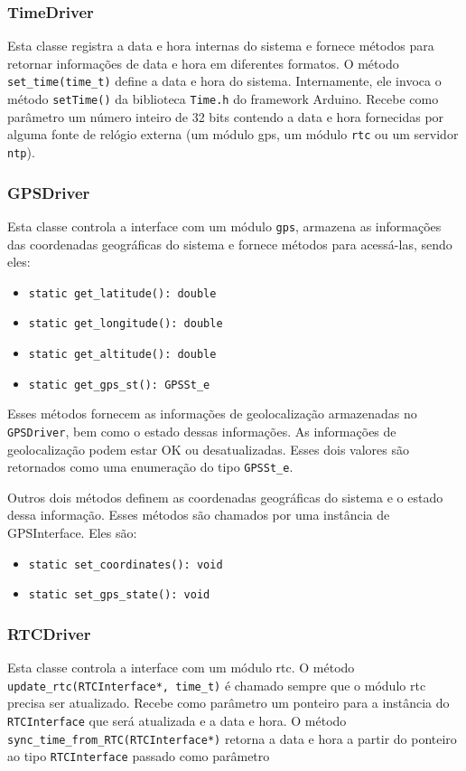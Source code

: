 \subsubsection{TimeDriver}
Esta classe registra a data e hora internas do sistema e fornece métodos para retornar informações de data e hora em diferentes formatos. O método \texttt{set\_time(time\_t)} define a data e hora do sistema. Internamente, ele invoca o método \texttt{setTime()} da biblioteca \texttt{Time.h} do framework Arduino. Recebe como parâmetro um número inteiro de 32 bits contendo a data e hora fornecidas por alguma fonte de relógio externa (um módulo \acrshort{gps}, um módulo \texttt{rtc} ou um servidor \texttt{ntp}).
\subsubsection{GPSDriver}
Esta classe controla a interface com um módulo \texttt{gps}, armazena as informações das coordenadas geográficas do sistema e fornece métodos para acessá-las, sendo eles:

\begin{itemize}
    \item \texttt{{static} get\_latitude(): double}
    \item \texttt{{static} get\_longitude(): double}
    \item \texttt{{static} get\_altitude(): double}
    \item \texttt{{static} get\_gps\_st(): GPSSt\_e}
\end{itemize}

Esses métodos fornecem as informações de geolocalização armazenadas no \texttt{GPSDriver}, bem como o estado dessas informações. As informações de geolocalização podem estar OK ou desatualizadas. Esses dois valores são retornados como uma enumeração do tipo \texttt{GPSSt\_e}.

Outros dois métodos definem as coordenadas geográficas do sistema e o estado dessa informação. Esses métodos são chamados por uma instância de GPSInterface. Eles são:

\begin{itemize}
    \item \texttt{{static} set\_coordinates(): void}
    \item \texttt{{static} set\_gps\_state(): void}
\end{itemize}

\subsubsection{RTCDriver}
Esta classe controla a interface com um módulo \acrshort{rtc}. O método \texttt{update\_rtc(RTCInterface*, time\_t)} é chamado sempre que o módulo \acrshort{rtc} precisa ser atualizado. Recebe como parâmetro um ponteiro para a instância do \texttt{RTCInterface} que será atualizada e a data e hora. O método \texttt{sync\_time\_from\_RTC(RTCInterface*)} retorna a data e hora a partir do ponteiro ao tipo \texttt{RTCInterface} passado como parâmetro

